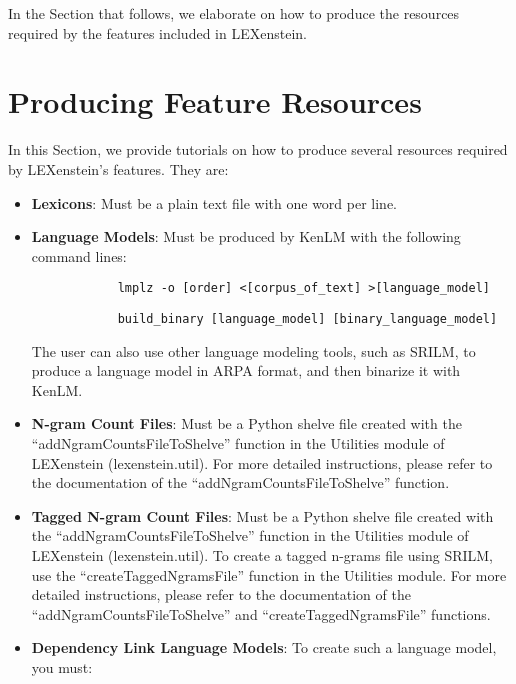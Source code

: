In the Section that follows, we elaborate on how to produce the resources required by the features included in LEXenstein.



\section{Producing Feature Resources}
\label{prodfeatures}

In this Section, we provide tutorials on how to produce several resources required by LEXenstein's features. They are:

\begin{itemize}
	\item \textbf{Lexicons}: Must be a plain text file with one word per line.
	
	\item \textbf{Language Models}: Must be produced by KenLM with the following command lines:

			\begin{lstlisting}
			lmplz -o [order] <[corpus_of_text] >[language_model]
			\end{lstlisting}
			\begin{lstlisting}
			build_binary [language_model] [binary_language_model]
			\end{lstlisting}
			
		The user can also use other language modeling tools, such as SRILM, to produce a language model in ARPA format, and then binarize it with KenLM.
			
	\item \textbf{N-gram Count Files}: Must be a Python shelve file created with the ``addNgramCountsFileToShelve'' function in the Utilities module of LEXenstein (lexenstein.util). For more detailed instructions, please refer to the documentation of the ``addNgramCountsFileToShelve'' function.
	
	\item \textbf{Tagged N-gram Count Files}: Must be a Python shelve file created with the ``addNgramCountsFileToShelve'' function in the Utilities module of LEXenstein (lexenstein.util). To create a tagged n-grams file using SRILM, use the ``createTaggedNgramsFile'' function in the Utilities module. For more detailed instructions, please refer to the documentation of the ``addNgramCountsFileToShelve'' and ``createTaggedNgramsFile'' functions.
	
	\item \textbf{Dependency Link Language Models}: To create such a language model, you must:
	

\end{itemize}
